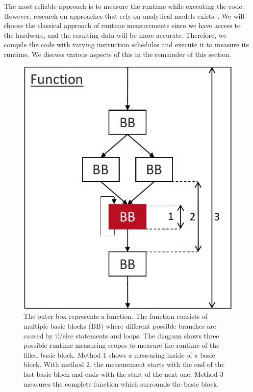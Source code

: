The most reliable approach is to measure the runtime while executing the code.
However, research on approaches that rely on analytical models exists~\cite{llvm:mca, mendis2019ithemal, taha2003instruction, laukemann2018automated}.
We will choose the classical approach of runtime measurements since we have access to the hardware, and the resulting data will be more accurate.
Therefore, we compile the code with varying instruction schedules and execute it to measure its runtime.
We discuss various aspects of this in the remainder of this section.

\begin{figure}
    \centering
    \includegraphics[scale=0.8]{img/ppt/runtime_measurement_scopes-crop.pdf}
    \caption[Possibile scopes for measuring runtimes]{The outer box represents a function. 
    The function consists of multiple basic blocks (BB) where different possible branches are caused by if/else statements and loops. 
    The diagram shows three possible runtime measuring scopes to measure the runtime of the filled basic block.
    Method 1 shows a measuring inside of a basic block. 
    With method 2, the measurement starts with the end of the last basic block and ends with the start of the next one.
    Method 3 measures the complete function which surrounds the basic block.}
    \label{fig:approach:runtime_scopes}
\end{figure}

